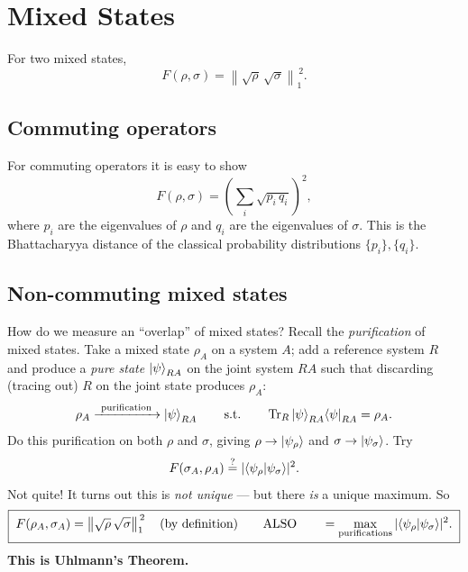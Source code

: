 \documentclass[11pt]{article}
\newcommand{\Tr}{\operatorname{Tr}}
\newcommand{\onenorm}[1]{\left\lVert #1 \right\rVert_{1}}
\begin{document}
\section{Mixed States}

For two mixed states,
\[
F(\rho,\sigma) = \onenorm{\sqrt{\rho}\,\sqrt{\sigma}}^{\,2}.
\]

\subsection{Commuting operators}

For commuting operators it is easy to show
\[
F(\rho,\sigma) = \left(\sum_i \sqrt{p_i\,q_i}\right)^{2},
\]
where $p_i$ are the eigenvalues of $\rho$ and $q_i$ are the eigenvalues of
$\sigma$. This is the Bhattacharyya distance of the classical probability
distributions $\{p_i\},\{q_i\}$.

\subsection{Non-commuting mixed states}

How do we measure an ``overlap'' of mixed states? Recall the
\emph{purification} of mixed states. Take a mixed state $\rho_A$ on a system
$A$; add a reference system $R$ and produce a \emph{pure state}
$\ket{\psi}_{RA}$ on the joint system $RA$ such that discarding (tracing out)
$R$ on the joint state produces $\rho_A$:
\[
\rho_A \xrightarrow{\ \text{purification}\ } \ket{\psi}_{RA}
\qquad\text{s.t.}\qquad
\Tr_R \ket{\psi}_{RA}\!\bra{\psi}_{RA} = \rho_A.
\]
Do this purification on both $\rho$ and $\sigma$, giving
$\rho\to\ket{\psi_\rho}$ and $\sigma\to\ket{\psi_\sigma}$. Try
\[
F(\sigma_A,\rho_A) \overset{?}{=} |\!\braket{\psi_\rho|\psi_\sigma}\!|^{2}.
\]
Not quite! It turns out this is \emph{not unique} --- but there \emph{is} a
unique maximum. So
\[
\boxed{\;
F(\rho_A,\sigma_A) = \onenorm{\sqrt{\rho}\,\sqrt{\sigma}}^{\,2}
\quad\text{(by definition)}
\qquad\text{ALSO}\qquad
= \max_{\text{purifications}} |\!\braket{\psi_\rho|\psi_\sigma}\!|^{2}.
\;}
\]
\textbf{This is Uhlmann's Theorem.}

\end{document}
